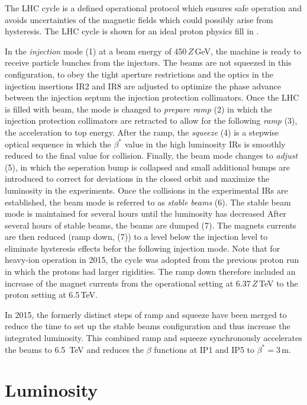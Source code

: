 The LHC cycle is a defined operational protocol which ensures safe operation and avoids uncertainties of the magnetic fields which could possibly arise from hysteresis. The LHC cycle is shown for an ideal proton physics fill in . 

In the \textit{injection} mode (1) at a beam energy of 450$\,Z\,$GeV, the machine is ready to receive particle bunches from the injectors. The beams are not squeezed in this configuration, to obey the tight aperture restrictions and the optics in the injection insertions IR2 and IR8 are adjusted to optimize the phase advance between the injection septum the injection protection collimators. Once the LHC is filled with beam, the mode is changed to \textit{prepare ramp} (2) in which the injection protection collimators are retracted to allow for the following \textit{ramp} (3), the acceleration to top energy. After the ramp, the \textit{squeeze} (4) is a stepwise optical sequence in which the $\beta^*$ value in the high luminosity IRs is smoothly reduced to the final value for collision. Finally, the beam mode changes to \textit{adjust} (5), in which the seperation bump is collapsed and small additional bumps are introduced to correct for deviations in the closed orbit and maximize the luminosity in the experiments. Once the collisions in the experimental IRs are established, the beam mode is referred to as \textit{stable beams} (6). 
The stable beam mode is maintained for several hours until the luminosity has decreased 
After several hours of stable beams, the beams are dumped (7). The magnets currents are then reduced (ramp down, (7)) to a level below the injection level to eliminate hysteresis effects befor the following injection mode. Note that for heavy-ion operation in 2015, the cycle was adopted from the previous proton run in which the protons had larger rigidities. The ramp down therefore included an increase of the magnet currents from the operational setting at 6.37$\,Z\,$TeV to the proton setting at 6.5$\,$TeV.

In 2015, the formerly distinct steps of ramp and squeeze have been merged to reduce the time to set up the stable beams configuration and thus increase the integrated luminosity. This combined ramp and squeeze synchronously accelerates the beams to 6.5~TeV and reduces the $\beta$ functions at IP1 and IP5 to $\beta^*=3\,$m.



\section{Luminosity} \label{chap:lumi}

